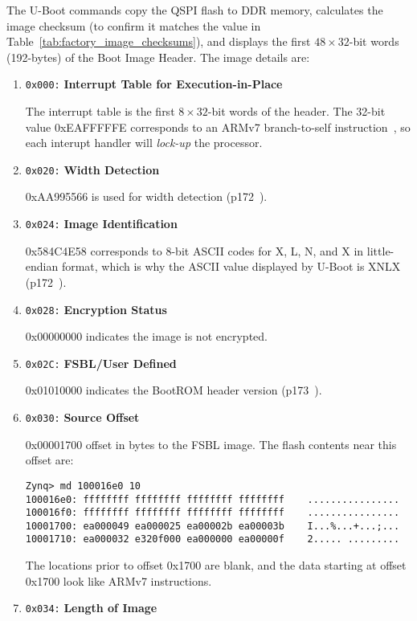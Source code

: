 %
The U-Boot commands copy the QSPI flash to DDR memory, calculates the
image checksum (to confirm it matches the value in
Table~\ref{tab:factory_image_checksums}),
and displays the first $48\times32$-bit words (192-bytes) of the
Boot Image Header. The image details are:
%
\begin{enumerate}
\item \texttt{0x000:} \textbf{Interrupt Table for Execution-in-Place}

The interrupt table is the first $8\times32$-bit words of the header.
The 32-bit value 0xEAFFFFFE corresponds to an ARMv7 branch-to-self
instruction~\cite{ARM_ARMv7_2018}, so each interupt handler will
\emph{lock-up} the processor.

\item \texttt{0x020:} \textbf{Width Detection}

0xAA995566 is used for width detection (p172~\cite{Xilinx_UG585_2018}).

\item \texttt{0x024:} \textbf{Image Identification}

0x584C4E58 corresponds to 8-bit ASCII codes for
X, L, N, and X in little-endian format, which is why the ASCII
value displayed by U-Boot is XNLX  (p172~\cite{Xilinx_UG585_2018}).

\item \texttt{0x028:} \textbf{Encryption Status}

0x00000000 indicates the image is not encrypted.

\item \texttt{0x02C:} \textbf{FSBL/User Defined}

0x01010000 indicates the BootROM header version (p173~\cite{Xilinx_UG585_2018}).

\item \texttt{0x030:} \textbf{Source Offset}

0x00001700 offset in bytes to the FSBL image. The flash contents
near this offset are:
%
\begin{verbatim}
Zynq> md 100016e0 10
100016e0: ffffffff ffffffff ffffffff ffffffff    ................
100016f0: ffffffff ffffffff ffffffff ffffffff    ................
10001700: ea000049 ea000025 ea00002b ea00003b    I...%...+...;...
10001710: ea000032 e320f000 ea000000 ea00000f    2..... .........
\end{verbatim}
%
The locations prior to offset 0x1700 are blank, and the data starting
at offset 0x1700 look like ARMv7 instructions.

\item \texttt{0x034:} \textbf{Length of Image}


\end{enumerate}

